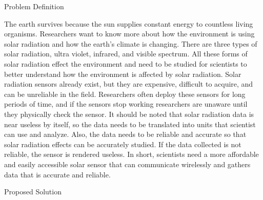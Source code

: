 \documentclass[10pt,draftclsnofoot,onecolumn,letterpaper]{article}
\begin{document}
\newpage
    
\vspace{\baselineskip}\begin{Center}
{\fontsize{14pt}{16.8pt}\selectfont Problem Definition\par}
\end{Center}\par
    
{\fontsize{10pt}{12.0pt}\selectfont The earth survives because the sun supplies constant energy to countless living organisms. Researchers want to know more about how the environment is using solar radiation and how the earth’s climate is changing. There are three types of solar radiation, ultra violet, infrared, and visible spectrum. All these forms of solar radiation effect the environment and need to be studied for scientists to better understand how the environment is affected by solar radiation. Solar radiation sensors already exist, but they are expensive, difficult to acquire, and can be unreliable in the field. Researchers often deploy these sensors for long periods of time, and if the sensors stop working researchers are unaware until they physically check the sensor. It should be noted that solar radiation data is near useless by itself, so the data needs to be translated into units that scientist can use and analyze. Also, the data needs to be reliable and accurate so that solar radiation effects can be accurately studied. If the data collected is not reliable, the sensor is rendered useless. In short, scientists need a more affordable and easily accessible solar sensor that can communicate wirelessly and gathers data that is accurate and reliable. \par}\par
    
\begin{Center}
{\fontsize{14pt}{16.8pt}\selectfont Proposed Solution\par}
\end{Center}\par
    
\end{document}
